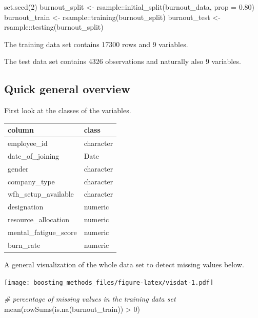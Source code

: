 \documentclass[
]{book}
\newenvironment{Shaded}{\begin{snugshade}}{\end{snugshade}}
\newcommand{\AttributeTok}[1]{\textcolor[rgb]{0.77,0.63,0.00}{#1}}
\newcommand{\CommentTok}[1]{\textcolor[rgb]{0.56,0.35,0.01}{\textit{#1}}}
\newcommand{\DecValTok}[1]{\textcolor[rgb]{0.00,0.00,0.81}{#1}}
\newcommand{\FloatTok}[1]{\textcolor[rgb]{0.00,0.00,0.81}{#1}}
\newcommand{\FunctionTok}[1]{\textcolor[rgb]{0.00,0.00,0.00}{#1}}
\newcommand{\NormalTok}[1]{#1}
\newcommand{\OtherTok}[1]{\textcolor[rgb]{0.56,0.35,0.01}{#1}}
\newcommand{\SpecialCharTok}[1]{\textcolor[rgb]{0.00,0.00,0.00}{#1}}
\begin{document}
\begin{Shaded}
\begin{Highlighting}[]
\FunctionTok{set.seed}\NormalTok{(}\DecValTok{2}\NormalTok{)}
\NormalTok{burnout\_split }\OtherTok{\textless{}{-}}\NormalTok{ rsample}\SpecialCharTok{::}\FunctionTok{initial\_split}\NormalTok{(burnout\_data, }\AttributeTok{prop =} \FloatTok{0.80}\NormalTok{)}
\NormalTok{burnout\_train }\OtherTok{\textless{}{-}}\NormalTok{ rsample}\SpecialCharTok{::}\FunctionTok{training}\NormalTok{(burnout\_split)}
\NormalTok{burnout\_test  }\OtherTok{\textless{}{-}}\NormalTok{ rsample}\SpecialCharTok{::}\FunctionTok{testing}\NormalTok{(burnout\_split)}
\end{Highlighting}
\end{Shaded}

The training data set contains 17300 rows and 9 variables.

The test data set contains 4326 observations and naturally also 9 variables.

\hypertarget{quick-general-overview}{%
\subsection{Quick general overview}\label{quick-general-overview}}

First look at the classes of the variables.

\begin{tabular}{l|l}
\hline
column & class\\
\hline
employee\_id & character\\
\hline
date\_of\_joining & Date\\
\hline
gender & character\\
\hline
company\_type & character\\
\hline
wfh\_setup\_available & character\\
\hline
designation & numeric\\
\hline
resource\_allocation & numeric\\
\hline
mental\_fatigue\_score & numeric\\
\hline
burn\_rate & numeric\\
\hline
\end{tabular}

A general visualization of the whole data set to detect missing values below.

\texttt{[image: boosting\_methods\_files/figure-latex/visdat-1.pdf]}

\begin{Shaded}
\begin{Highlighting}[]
\CommentTok{\# percentage of missing values in the training data set}
\FunctionTok{mean}\NormalTok{(}\FunctionTok{rowSums}\NormalTok{(}\FunctionTok{is.na}\NormalTok{(burnout\_train)) }\SpecialCharTok{\textgreater{}} \DecValTok{0}\NormalTok{)}
\end{Highlighting}
\end{Shaded}
\end{document}
